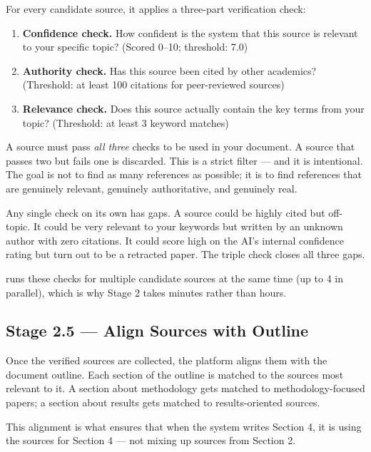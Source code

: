 For every candidate source, it applies a three-part verification check:

\begin{enumerate}
  \item \textbf{Confidence check.} How confident is the system that this source
        is relevant to your specific topic? (Scored 0–10; threshold: 7.0)
  \item \textbf{Authority check.} Has this source been cited by other academics?
        (Threshold: at least 100 citations for peer-reviewed sources)
  \item \textbf{Relevance check.} Does this source actually contain the key terms
        from your topic? (Threshold: at least 3 keyword matches)
\end{enumerate}

A source must pass \emph{all three} checks to be used in your document.
A source that passes two but fails one is discarded.
This is a strict filter — and it is intentional.
The goal is not to find as many references as possible; it is to find references
that are genuinely relevant, genuinely authoritative, and genuinely real.

\begin{keybox}[title=Why Three Checks Instead of One?]
Any single check on its own has gaps. A source could be highly cited but
off-topic. It could be very relevant to your keywords but written by an unknown
author with zero citations. It could score high on the AI's internal confidence
rating but turn out to be a retracted paper. The triple check closes all three gaps.
\end{keybox}

\sys{} runs these checks for multiple candidate sources at the same time
(up to 4 in parallel), which is why Stage 2 takes minutes rather than hours.

\subsection{Stage 2.5 — Align Sources with Outline}

Once the verified sources are collected, the platform aligns them with the document outline.
Each section of the outline is matched to the sources most relevant to it.
A section about methodology gets matched to methodology-focused papers;
a section about results gets matched to results-oriented sources.

This alignment is what ensures that when the system writes Section 4, it is using
the sources for Section 4 — not mixing up sources from Section 2.

